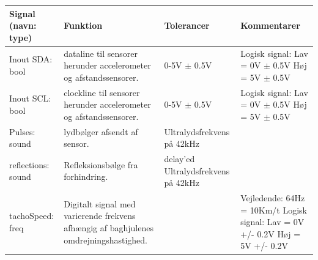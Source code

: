 \begin{table}[h]
	\centering
	\begin{tabularx}{\textwidth}{|l|X|X|X|} \hline
	\textbf{Signal (navn: type)} & \textbf{Funktion} & \textbf{Tolerancer} & \textbf{Kommentarer} \\ \hline
Inout SDA: bool
	& \IIC dataline til sensorer herunder accelerometer og afstandssensorer. 
	& 0-5V $\pm$ 0.5V
 	& Logisk signal: \newline
		Lav = 0V $\pm$ 0.5V \newline
		Høj = 5V $\pm$ 0.5V
	\\ \hline

Inout SCL: bool
	& \IIC clockline  til sensorer herunder accelerometer og afstandssensorer. 
	& 0-5V $\pm$ 0.5V
 	& Logisk signal: \newline
		Lav = 0V $\pm$ 0.5V \newline
		Høj = 5V $\pm$ 0.5V
	\\ \hline

Pulses: sound
	& lydbølger afsendt af sensor. 
	& Ultralydsfrekvens på 42kHz
 	& ~
	\\ \hline
	
reflections: sound
	& Refleksionsbølge fra forhindring. 
	& delay'ed Ultralydsfrekvens på 42kHz
 	& ~
	\\ \hline
	
tachoSpeed: freq
	& Digitalt signal med varierende frekvens afhængig af baghjulenes omdrejningshastighed.
	& ~
	& Vejledende: \newline
		64Hz = 10Km/t \newline
		Logisk signal: \newline
		Lav = 0V +/- 0.2V \newline
		Høj = 5V +/- 0.2V	\\ \hline
	\end{tabularx}
\end{table}